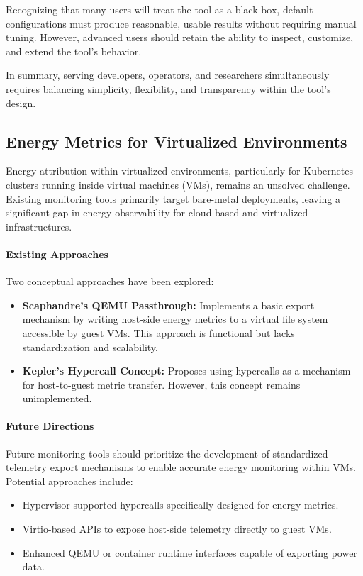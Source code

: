 Recognizing that many users will treat the tool as a black box, default configurations must produce reasonable, usable results without requiring manual tuning. However, advanced users should retain the ability to inspect, customize, and extend the tool’s behavior.

In summary, serving developers, operators, and researchers simultaneously requires balancing simplicity, flexibility, and transparency within the tool’s design.

\subsection{Energy Metrics for Virtualized Environments}
\label{sec:future-virtualized-environments}

Energy attribution within virtualized environments, particularly for Kubernetes clusters running inside virtual machines (VMs), remains an unsolved challenge. Existing monitoring tools primarily target bare-metal deployments, leaving a significant gap in energy observability for cloud-based and virtualized infrastructures.

\paragraph{Existing Approaches}
Two conceptual approaches have been explored:
\begin{itemize}
    \item \textbf{Scaphandre’s QEMU Passthrough:} Implements a basic export mechanism by writing host-side energy metrics to a virtual file system accessible by guest VMs. This approach is functional but lacks standardization and scalability.
    \item \textbf{Kepler’s Hypercall Concept:} Proposes using hypercalls as a mechanism for host-to-guest metric transfer. However, this concept remains unimplemented.
\end{itemize}

\paragraph{Future Directions}
Future monitoring tools should prioritize the development of standardized telemetry export mechanisms to enable accurate energy monitoring within VMs. Potential approaches include:
\begin{itemize}
    \item Hypervisor-supported hypercalls specifically designed for energy metrics.
    \item Virtio-based APIs to expose host-side telemetry directly to guest VMs.
    \item Enhanced QEMU or container runtime interfaces capable of exporting power data.
\end{itemize}

